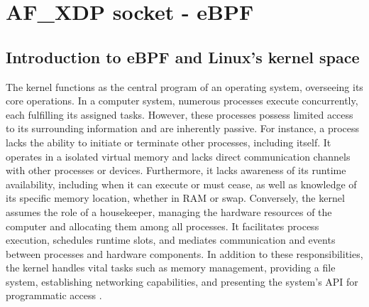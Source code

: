 \section{AF\_XDP socket - eBPF}
\subsection{Introduction to eBPF and Linux's kernel space}
The kernel functions as the central program of an operating system, overseeing its core operations. 
In a computer system, numerous processes execute concurrently, each fulfilling its assigned tasks. 
However, these processes possess limited access to its surrounding information and are inherently passive.
For instance, a process lacks the ability to initiate or terminate other processes, including itself. 
It operates in a isolated virtual memory and lacks direct communication channels with other processes or devices. 
Furthermore, it lacks awareness of its runtime availability, including when it can execute or must cease, as well as knowledge of its specific memory location, whether in RAM or swap.
Conversely, the kernel assumes the role of a housekeeper, managing the hardware resources of the computer and allocating them among all processes. It facilitates process execution, schedules runtime slots, and mediates communication and events between processes and hardware components.
In addition to these responsibilities, the kernel handles vital tasks such as memory management, providing a file system, establishing networking capabilities, and presenting the system's \ac{API} for programmatic access \cite{kerrisk_linux_2010}.

